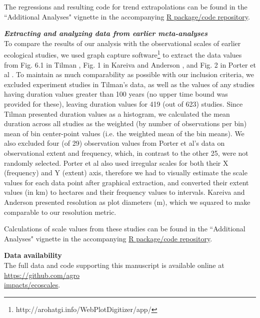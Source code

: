 \documentclass[12pt]{article}
\begin{document}
The regressions and resulting code for trend extrapolations can be found in the ``Additional Analyses" vignette in the accompanying \href{https://github.com/agroimpacts/ecoscales}{R package/code repository}.

\vspace{5pt}
\noindent \textbf{\emph{Extracting and analyzing data from earlier meta-analyses}}\\
To compare the results of our analysis with the observational scales of earlier ecological studies, we used graph capture software\footnote{http://arohatgi.info/WebPlotDigitizer/app/} to extract the data values from Fig. 6.1 in Tilman \cite{tilman_ecological_1989}, Fig. 1 in Kareiva and Anderson \cite{kareiva_spatial_1988}, and Fig. 2 in Porter et al \cite{porter_crop_2005}. To maintain as much comparability as possible with our inclusion criteria, we excluded experiment studies in Tilman's data, as well as the values of any studies having duration values greater than 100 years (no upper time bound was provided for these), leaving duration values for 419 (out of 623) studies. Since Tilman presented duration values as a histogram, we calculated the mean duration across all studies as the weighted (by number of observations per bin) mean of bin center-point values (i.e. the weighted mean of the bin means).  We also excluded four (of 29) observation values from Porter et al's data on observational extent and frequency, which, in contrast to the other 25, were not randomly selected. Porter et al also used irregular scales for both their X (frequency) and Y (extent) axis, therefore we had to visually estimate the scale values for each data point after graphical extraction, and converted their extent values (in km) to hectares and their frequency values to intervals. Kareiva and Anderson presented resolution as plot diameters (m), which we squared to make comparable to our resolution metric.  

Calculations of scale values from these studies can be found in the ``Additional Analyses" vignette in the accompanying \href{https://github.com/agroimpacts/ecoscales}{R package/code repository}.


\vspace{10pt}
\noindent \textbf{Data availability}
\vspace{5pt}
\\
The full data and code supporting this manuscript is available online at \href{https://github.com/agroimpacts/ecoscales}{https://github.com/agro\\impacts/ecoscales}.
\end{document}
